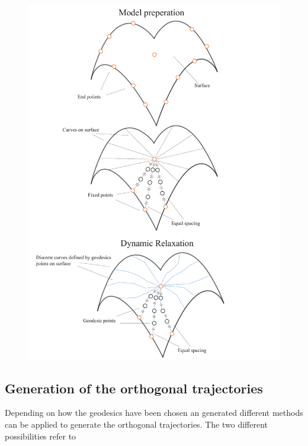 \begin{figure}[H]
\centering
\includegraphics[width = 1.0\linewidth ]{figure/Method/Stepps.pdf}

\end{figure}


\subsection{Generation of the orthogonal trajectories}

Depending on how the geodesics have been chosen an generated different methods can be applied to generate the orthogonal trajectories. The two different possibilities refer to

